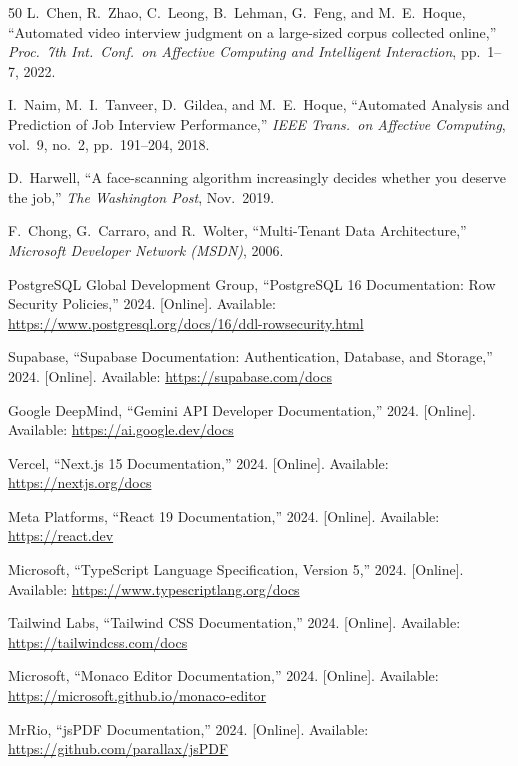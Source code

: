 \begin{thebibliography}{50}
L.~Chen, R.~Zhao, C.~Leong, B.~Lehman, G.~Feng, and M.~E.~Hoque, ``Automated video interview judgment on a large-sized corpus collected online,'' \textit{Proc.\ 7th Int.\ Conf.\ on Affective Computing and Intelligent Interaction}, pp.~1--7, 2022.

I.~Naim, M.~I.~Tanveer, D.~Gildea, and M.~E.~Hoque, ``Automated Analysis and Prediction of Job Interview Performance,'' \textit{IEEE Trans.\ on Affective Computing}, vol.~9, no.~2, pp.~191--204, 2018.

D.~Harwell, ``A face-scanning algorithm increasingly decides whether you deserve the job,'' \textit{The Washington Post}, Nov.\ 2019.

F.~Chong, G.~Carraro, and R.~Wolter, ``Multi-Tenant Data Architecture,'' \textit{Microsoft Developer Network (MSDN)}, 2006.

PostgreSQL Global Development Group, ``PostgreSQL 16 Documentation: Row Security Policies,'' 2024. [Online]. Available: \url{https://www.postgresql.org/docs/16/ddl-rowsecurity.html}

Supabase, ``Supabase Documentation: Authentication, Database, and Storage,'' 2024. [Online]. Available: \url{https://supabase.com/docs}

Google DeepMind, ``Gemini API Developer Documentation,'' 2024. [Online]. Available: \url{https://ai.google.dev/docs}

Vercel, ``Next.js 15 Documentation,'' 2024. [Online]. Available: \url{https://nextjs.org/docs}

Meta Platforms, ``React 19 Documentation,'' 2024. [Online]. Available: \url{https://react.dev}

Microsoft, ``TypeScript Language Specification, Version 5,'' 2024. [Online]. Available: \url{https://www.typescriptlang.org/docs}

Tailwind Labs, ``Tailwind CSS Documentation,'' 2024. [Online]. Available: \url{https://tailwindcss.com/docs}

Microsoft, ``Monaco Editor Documentation,'' 2024. [Online]. Available: \url{https://microsoft.github.io/monaco-editor}

MrRio, ``jsPDF Documentation,'' 2024. [Online]. Available: \url{https://github.com/parallax/jsPDF}


\end{thebibliography}
